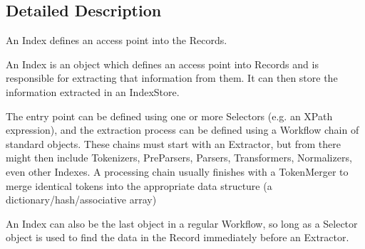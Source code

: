 \subsection{Detailed Description}
\begin{DoxyVerb}An Index defines an access point into the Records.

An Index is an object which defines an access point into Records and is 
responsible for extracting that information from them. It can then store 
the information extracted in an IndexStore.

The entry point can be defined using one or more Selectors (e.g. an XPath 
expression), and the extraction process can be defined using a Workflow 
chain of standard objects. These chains must start with an Extractor, but 
from there might then include Tokenizers, PreParsers, Parsers, 
Transformers, Normalizers, even other Indexes. A processing chain usually 
finishes with a TokenMerger to merge identical tokens into the appropriate 
data structure (a dictionary/hash/associative array)

An Index can also be the last object in a regular Workflow, so long as a 
Selector object is used to find the data in the Record immediately before 
an Extractor.
\end{DoxyVerb}
 

